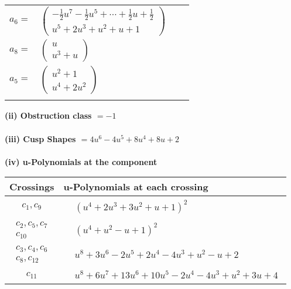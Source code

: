 \documentclass[1p]{elsarticle_modified}
\theoremstyle{definition}
\begin{document}
\begin{tabular}{m{7pt} m{180pt} m{7pt} m{180pt} }
\flushright $a_{6}=$&$\begin{pmatrix}-\frac{1}{2} u^7-\frac{1}{2} u^5+\cdots+\frac{1}{2} u+\frac{1}{2}\\u^5+2 u^3+u^2+u+1\end{pmatrix}$ \\
\flushright $a_{8}=$&$\begin{pmatrix}u\\u^3+u\end{pmatrix}$ \\
\flushright $a_{5}=$&$\begin{pmatrix}u^2+1\\u^4+2 u^2\end{pmatrix}$\\&\end{tabular}
\flushleft \textbf{(ii) Obstruction class $= -1$}\\~\\
\flushleft \textbf{(iii) Cusp Shapes $= 4 u^6-4 u^5+8 u^4+8 u+2$}\\~\\
\newpage\renewcommand{\arraystretch}{1}
\flushleft \textbf{(iv) u-Polynomials at the component}\newline \\
\begin{tabular}{m{50pt}|m{274pt}}
Crossings & \hspace{64pt}u-Polynomials at each crossing \\
\hline $$\begin{aligned}c_{1},c_{9}\end{aligned}$$&$\begin{aligned}
&(u^4+2 u^3+3 u^2+u+1)^2
\end{aligned}$\\
\hline $$\begin{aligned}c_{2},c_{5},c_{7}\\c_{10}\end{aligned}$$&$\begin{aligned}
&(u^4+u^2- u+1)^2
\end{aligned}$\\
\hline $$\begin{aligned}c_{3},c_{4},c_{6}\\c_{8},c_{12}\end{aligned}$$&$\begin{aligned}
&u^8+3 u^6-2 u^5+2 u^4-4 u^3+u^2- u+2
\end{aligned}$\\
\hline $$\begin{aligned}c_{11}\end{aligned}$$&$\begin{aligned}
&u^8+6 u^7+13 u^6+10 u^5-2 u^4-4 u^3+u^2+3 u+4
\end{aligned}$\\
\hline
\end{tabular}\\~\\
\end{document}

